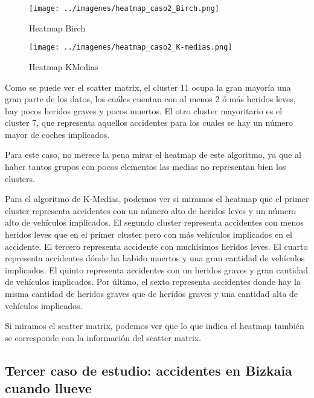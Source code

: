 	\begin{figure}[H]
		\centering
		\texttt{[image: ../imagenes/heatmap\_caso2\_Birch.png]}
		\caption{Heatmap Birch}
		\label{fig:hm_caso2_Birch}
	\end{figure}
	
	\begin{figure}[H]
		\centering
		\texttt{[image: ../imagenes/heatmap\_caso2\_K-medias.png]}
		\caption{Heatmap KMedias}
		\label{fig:hm_caso2_KMedias}
	\end{figure}

	\vspace{0.06in}
	Como se puede ver el scatter matrix, el cluster 11 ocupa la gran mayoría una gran parte de los datos, los cuáles cuentan con al menos 2 ó más heridos leves, hay pocos heridos graves y pocos muertos. El otro cluster mayoritario es el cluster 7, que representa aquellos accidentes para los cuales se hay un número mayor de coches implicados.
	
	\vspace{0.06in}
	
	Para este caso, no merece la pena mirar el heatmap de este algoritmo, ya que al haber tantos grupos con pocos elementos las medias no representan bien los clusters.
	
	\vspace{0.06in}
	
	Para el algoritmo de K-Medias, podemos ver si miramos el heatmap que el primer cluster representa accidentes con un número alto de heridos leves y un número alto de vehículos implicados. El segundo cluster representa accidentes con menos heridos leves que en el primer cluster pero con más vehículos implicados en el accidente. El tercero representa accidente con muchísimos heridos leves. El cuarto representa accidentes dónde ha habido muertos y una gran cantidad de vehículos implicados. El quinto representa accidentes con un heridos graves y gran cantidad de vehículos implicados. Por último, el sexto representa accidentes donde hay la misma cantidad de heridos graves que de heridos graves y una cantidad alta de vehículos implicados.
	
	\vspace{0.06in}
	
	Si miramos el scatter matrix, podemos ver que lo que indica el heatmap también se corresponde con la información del scatter matrix.
	
	\vspace{0.06in}

	\subsection[Caso de estudio 3]{Tercer caso de estudio: accidentes en Bizkaia cuando llueve}
